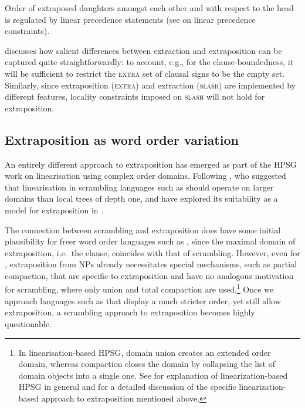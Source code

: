 \documentclass[output=paper,biblatex,babelshorthands,newtxmath,draftmode,colorlinks,citecolor=brown]{langscibook}
\begin{document}
Order of extraposed daughters amongst each other and with respect to
the head is regulated by linear precedence statements (see
 on linear precedence
constraints).

\citet{Keller:95} discusses how salient differences between extraction
and extraposition can be captured quite straightforwardly: to account,
e.g., for the clause-boundedness, it will be sufficient to restrict
the \textsc{extra} set of clausal signs to be the empty
set. Similarly, since extraposition (\textsc{extra}) and extraction
(\textsc{slash}) are implemented by different features, locality
constraints imposed on \textsc{slash} will not hold for extraposition.


\subsection{Extraposition as word order variation}

An entirely different approach to extraposition has emerged as part of
the HPSG work on linearisation using complex order domains. Following
\citet{Reape:94}, who suggested that linearisation in scrambling
languages such as  should operate on larger domains than local
trees of depth one, \citet{Kathol:95b,kathol_a00} and \citet{KP95a}
have explored its suitability as a model for extraposition in .

The connection between scrambling and extraposition does have some
initial plausibility for freer word order languages such as ,
since the maximal domain of extraposition, i.e.\ the clause, coincides
with that of scrambling. However, even for , extraposition from
NPs already necessitates special mechanisms, such as partial
compaction, that are specific to extraposition and have no analogous
motivation for scrambling, where only union and total compaction are
used.\footnote{In linearisation-based HPSG, domain union creates an
  extended order domain, whereas compaction closes the domain by
  collapsing the list of domain objects into a single one. See  for
  explanation of linearization-based HPSG in general and
   for a detailed discussion of the specific linearization-based
  approach to extraposition mentioned above.
} Once we
approach languages such as  that display a much stricter order,
yet still allow extraposition, a scrambling approach to extraposition
becomes highly questionable.
\end{document}
